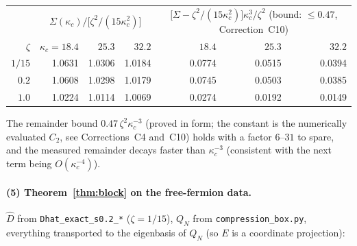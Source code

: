 \documentclass[11pt]{article}
\begin{document}
\begin{center}\small\begin{tabular}{r rrr rrr}\toprule
& \multicolumn{3}{c}{$\Sigma(\kappa_c)/\bigl[\zeta^2/(15\kappa_c^2)\bigr]$}
& \multicolumn{3}{c}{$\bigl[\Sigma-\zeta^2/(15\kappa_c^2)\bigr]\kappa_c^3/\zeta^2$ (bound: $\le0.47$, Correction~C10)}\\
$\zeta$ & $\kappa_c{=}18.4$ & $25.3$ & $32.2$ & $18.4$ & $25.3$ & $32.2$\\\midrule
$1/15$ & 1.0631 & 1.0306 & 1.0184 & 0.0774 & 0.0515 & 0.0394\\
$0.2$  & 1.0608 & 1.0298 & 1.0179 & 0.0745 & 0.0503 & 0.0385\\
$1.0$  & 1.0224 & 1.0114 & 1.0069 & 0.0274 & 0.0192 & 0.0149\\\bottomrule
\end{tabular}\end{center}
The remainder bound $0.47\,\zeta^2\kappa_c^{-3}$ (proved in form; the constant is the numerically evaluated $C_2$, see Corrections~C4 and~C10) holds with a factor $6$--$31$ to spare, and
the measured remainder decays faster than $\kappa_c^{-3}$ (consistent with the next term being
$O(\kappa_c^{-4})$).

\paragraph{(5) Theorem~\ref{thm:block} on the free-fermion data.}  $\widehat D$ from
\texttt{Dhat\_exact\_s0.2\_*} ($\zeta=1/15$), $Q_N$ from \texttt{compression\_box.py}, everything
transported to the eigenbasis of $Q_N$ (so $E$ is a coordinate projection):
\end{document}
